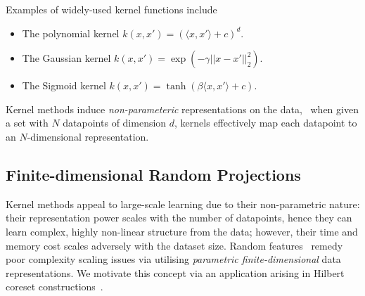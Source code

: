 Examples of widely-used kernel functions include
\begin{itemize}
	\item The polynomial kernel $k(x,x') = \left(\langle x, x'\rangle + c\right)^d$.
	\item The Gaussian kernel $k(x,x') = \exp(-\gamma||x-x'||_{2}^2)$.
	\item The Sigmoid kernel $k(x,x') = \tanh(\beta\langle x, x'\rangle + c)$.
\end{itemize}

Kernel methods induce \emph{non-parameteric} representations on the data, \ie~when given a set with $ N $ datapoints of dimension $d$, kernels effectively map each datapoint to an $N$-dimensional representation. %

\subsection{Finite-dimensional Random Projections}
\label{subsec:b-random-features}

Kernel methods appeal to large-scale learning due to their non-parametric nature: their representation power scales with the number of datapoints, hence they can learn complex, highly non-linear structure from the data; however, their time and memory cost scales adversely with the dataset size. Random features~\citep{rahimi08} remedy poor complexity scaling issues via utilising \emph{parametric finite-dimensional} data representations. We motivate this concept via an application arising in Hilbert coreset constructions~\cite{campbell19jmlr}.

